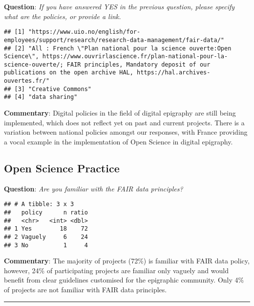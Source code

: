 \documentclass[
]{article}
\begin{document}
\textbf{Question}: \emph{If you have answered YES in the previous
question, please specify what are the policies, or provide a link.}

\begin{verbatim}
## [1] "https://www.uio.no/english/for-employees/support/research/research-data-management/fair-data/"                                                                                                                                                                
## [2] "All : French \"Plan national pour la science ouverte:Open Science\", https://www.ouvrirlascience.fr/plan-national-pour-la-science-ouverte/; FAIR principles, Mandatory deposit of our publications on the open archive HAL, https://hal.archives-ouvertes.fr/"
## [3] "Creative Commons"                                                                                                                                                                                                                                             
## [4] "data sharing"
\end{verbatim}

\textbf{Commentary}: Digital policies in the field of digital epigraphy
are still being implemented, which does not reflect yet on past and
current projects. There is a variation between national policies amongst
our responses, with France providing a vocal example in the
implementation of Open Science in digital epigraphy.

\hypertarget{open-science-practice-1}{%
\subsection{Open Science Practice}\label{open-science-practice-1}}

\textbf{Question}: \emph{Are you familiar with the FAIR data
principles?}

\begin{verbatim}
## # A tibble: 3 x 3
##   policy      n ratio
##   <chr>   <int> <dbl>
## 1 Yes        18    72
## 2 Vaguely     6    24
## 3 No          1     4
\end{verbatim}

\textbf{Commentary}: The majority of projects (72\%) is familiar with
FAIR data policy, however, 24\% of participating projects are familiar
only vaguely and would benefit from clear guidelines customised for the
epigraphic community. Only 4\% of projects are not familiar with FAIR
data principles.

\begin{center}\rule{0.5\linewidth}{0.5pt}\end{center}
\end{document}
